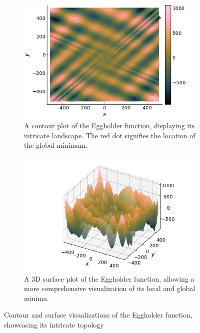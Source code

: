   \begin{figure}[ht!]
    \centering
    \begin{subfigure}[b]{0.45\textwidth}
      \centering
      \includegraphics[width=\textwidth]
        {img/test_functions/eggholder_contour.png}
      \caption{
        A contour plot of the Eggholder function, displaying its intricate
        landscape.
        The red dot signifies the location of the global minimum.
      }
      \label{fig:app:test:eggholder:contour}
    \end{subfigure}
    \hfill
    \begin{subfigure}[b]{0.45\textwidth}
      \centering
      \includegraphics[width=\textwidth]
        {img/test_functions/eggholder_surface.png}
      \caption{
        A 3D surface plot of the Eggholder function, allowing a more 
        comprehensive visualization of its local and global minima.
      }
      \label{fig:app:test:eggholder:surface}
    \end{subfigure}
    \caption{
      Contour and surface visualizations of the Eggholder function, showcasing 
      its intricate topology
    }
    \label{fig:app:test:eggholder}
  \end{figure}
